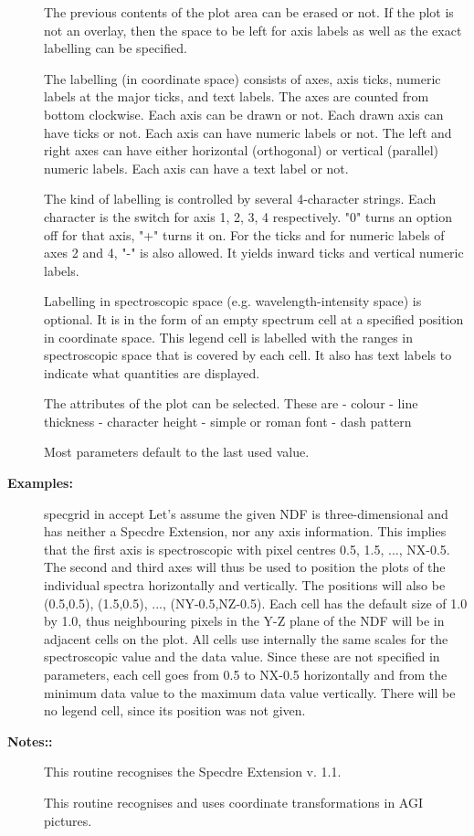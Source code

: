 \begin{description}
\begin{terminalv}
   The previous contents of the plot area can be erased or not.
   If the plot is not an overlay, then the space to be left for
   axis labels as well as the exact labelling can be specified.

   The labelling (in coordinate space) consists of axes, axis ticks,
   numeric labels at the major ticks, and text labels. The axes are
   counted from bottom clockwise. Each axis can be drawn or not. Each
   drawn axis can have ticks or not. Each axis can have numeric
   labels or not. The left and right axes can have either horizontal
   (orthogonal) or vertical (parallel) numeric labels. Each axis can
   have a text label or not.

   The kind of labelling is controlled by several 4-character
   strings. Each character is the switch for axis 1, 2, 3, 4
   respectively. "0" turns an option off for that axis, "+" turns
   it on. For the ticks and for numeric labels of axes 2 and 4, "-"
   is also allowed. It yields inward ticks and vertical numeric
   labels.

   Labelling in spectroscopic space (e.g. wavelength-intensity space)
   is optional. It is in the form of an empty spectrum cell at a
   specified position in coordinate space. This legend cell is
   labelled with the ranges in spectroscopic space that is covered by
   each cell. It also has text labels to indicate what quantities are
   displayed.

   The attributes of the plot can be selected. These are
   -  colour
   -  line thickness
   -  character height
   -  simple or roman font
   -  dash pattern

   Most parameters default to the last used value.
\end{terminalv}

\item [\textbf{Examples:}]
\begin{terminalv}
specgrid in accept
   Let's assume the given NDF is three-dimensional and has neither
   a Specdre Extension, nor any axis information. This implies
   that the first axis is spectroscopic with pixel centres 0.5,
   1.5, ..., NX-0.5. The second and third axes will thus be used
   to position the plots of the individual spectra horizontally
   and vertically. The positions will also be (0.5,0.5),
   (1.5,0.5), ..., (NY-0.5,NZ-0.5). Each cell has the default size
   of 1.0 by 1.0, thus neighbouring pixels in the Y-Z plane of the
   NDF will be in adjacent cells on the plot. All cells use
   internally the same scales for the spectroscopic value and the
   data value. Since these are not specified in parameters, each
   cell goes from 0.5 to NX-0.5 horizontally and from the minimum
   data value to the maximum data value vertically. There will be
   no legend cell, since its position was not given.

\end{terminalv}

\item [\textbf{Notes::}]
This routine recognises the Specdre Extension v. 1.1.

This routine recognises and uses coordinate transformations in
AGI pictures.
\end{description}
